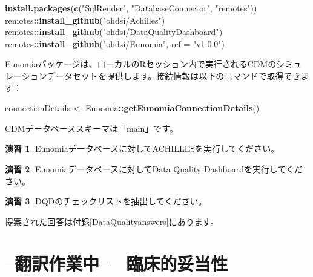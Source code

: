 \documentclass[
  11pt]{book}
\newenvironment{Shaded}{\begin{snugshade}}{\end{snugshade}}
\newcommand{\AttributeTok}[1]{\textcolor[rgb]{0.13,0.29,0.53}{#1}}
\newcommand{\FunctionTok}[1]{\textcolor[rgb]{0.13,0.29,0.53}{\textbf{#1}}}
\newcommand{\NormalTok}[1]{#1}
\newcommand{\OtherTok}[1]{\textcolor[rgb]{0.56,0.35,0.01}{#1}}
\newcommand{\SpecialCharTok}[1]{\textcolor[rgb]{0.81,0.36,0.00}{\textbf{#1}}}
\newcommand{\StringTok}[1]{\textcolor[rgb]{0.31,0.60,0.02}{#1}}
\theoremstyle{definition}
\theoremstyle{definition}
\theoremstyle{definition}
\newtheorem{exercise}{演習}[chapter]
\theoremstyle{definition}
\theoremstyle{remark}
\begin{document}
\begin{Shaded}
\begin{Highlighting}[]
\FunctionTok{install.packages}\NormalTok{(}\FunctionTok{c}\NormalTok{(}\StringTok{"SqlRender"}\NormalTok{, }\StringTok{"DatabaseConnector"}\NormalTok{, }\StringTok{"remotes"}\NormalTok{))}
\NormalTok{remotes}\SpecialCharTok{::}\FunctionTok{install\_github}\NormalTok{(}\StringTok{"ohdsi/Achilles"}\NormalTok{)}
\NormalTok{remotes}\SpecialCharTok{::}\FunctionTok{install\_github}\NormalTok{(}\StringTok{"ohdsi/DataQualityDashboard"}\NormalTok{)}
\NormalTok{remotes}\SpecialCharTok{::}\FunctionTok{install\_github}\NormalTok{(}\StringTok{"ohdsi/Eunomia"}\NormalTok{, }\AttributeTok{ref =} \StringTok{"v1.0.0"}\NormalTok{)}
\end{Highlighting}
\end{Shaded}

Eunomiaパッケージは、ローカルのRセッション内で実行されるCDMのシミュレーションデータセットを提供します。接続情報は以下のコマンドで取得できます：

\begin{Shaded}
\begin{Highlighting}[]
\NormalTok{connectionDetails }\OtherTok{\textless{}{-}}\NormalTok{ Eunomia}\SpecialCharTok{::}\FunctionTok{getEunomiaConnectionDetails}\NormalTok{()}
\end{Highlighting}
\end{Shaded}

CDMデータベーススキーマは「main」です。

\begin{exercise}
\protect\hypertarget{exr:exerciseRunAchilles}{}\label{exr:exerciseRunAchilles}Eunomiaデータベースに対してACHILLESを実行してください。
\end{exercise}

\begin{exercise}
\protect\hypertarget{exr:exerciseRunDQD}{}\label{exr:exerciseRunDQD}Eunomiaデータベースに対してData Quality Dashboardを実行してください。
\end{exercise}

\begin{exercise}
\protect\hypertarget{exr:exerciseViewDQD}{}\label{exr:exerciseViewDQD}DQDのチェックリストを抽出してください。
\end{exercise}

提案された回答は付録\ref{DataQualityanswers}にあります。

\chapter{--翻訳作業中--　臨床的妥当性}\label{ClinicalValidity}
\end{document}
